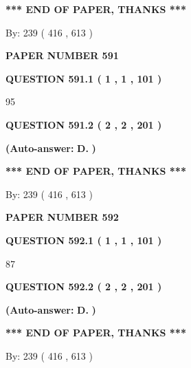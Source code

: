 \documentclass{ctexart}
\begin{document}
 
   
   
   
   
\vspace{1.0in} 
{\textbf{\large{ *** END OF PAPER, THANKS *** }}} 
   
   
\hspace{1.0in} By: 
 239 ( 416 ,  613 )
   
   
   
   
\newpage 
\setcounter{page}{ 
   591001 } 
   
   
 {\textbf{ \Large{ PAPER NUMBER  591  }}}
   
   
   
   
  
  
{\textbf{\large{QUESTION
591.1 
 ( 1 , 1 , 101 )
}}}

95
  
  
{\textbf{\large{QUESTION
591.2 
 ( 2 , 2 , 201 )
}}}
 
 
{\textbf{(Auto-answer:}}
{\textbf{\large{
D.}}}
{\textbf{)}}
 
 
   
   
   
   
\vspace{1.0in} 
{\textbf{\large{ *** END OF PAPER, THANKS *** }}} 
   
   
\hspace{1.0in} By: 
 239 ( 416 ,  613 )
   
   
   
   
\newpage 
\setcounter{page}{ 
   592001 } 
   
   
 {\textbf{ \Large{ PAPER NUMBER  592  }}}
   
   
   
   
  
  
{\textbf{\large{QUESTION
592.1 
 ( 1 , 1 , 101 )
}}}

87
  
  
{\textbf{\large{QUESTION
592.2 
 ( 2 , 2 , 201 )
}}}
 
 
{\textbf{(Auto-answer:}}
{\textbf{\large{
D.}}}
{\textbf{)}}
 
 
   
   
   
   
\vspace{1.0in} 
{\textbf{\large{ *** END OF PAPER, THANKS *** }}} 
   
   
\hspace{1.0in} By: 
 239 ( 416 ,  613 )
   
   
   
   
\newpage 
\setcounter{page}{ 
   593001 } 
   
\end{document}
